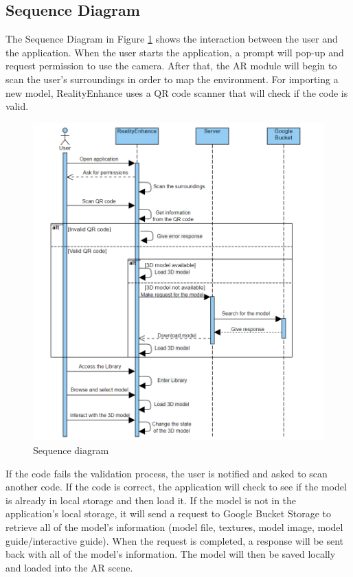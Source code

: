 \subsection*{Sequence Diagram}
The Sequence Diagram in Figure \ref{fig:SequenceDiagram} shows the interaction between the user and the application. When the user starts the application, a prompt will pop-up and request permission to use the camera. After that, the \ac{AR} module will begin to scan the user's surroundings in order to map the environment. For importing a new model, RealityEnhance uses a \ac{QR} code scanner that will check if the code is valid.
\begin{figure}[ht]
    \centering
    \includegraphics[width=1\textwidth]{img/SequenceDiagram.png}
    \caption{Sequence diagram}
    \label{fig:SequenceDiagram}
\end{figure}
\newpage

If the code fails the validation process, the user is notified and asked to scan another code. If the code is correct, the application will check to see if the model is already in local storage and then load it. If the model is not in the application's local storage, it will send a request to Google Bucket Storage to retrieve all of the model's information (model file, textures, model image, model guide/interactive guide). When the request is completed, a response will be sent back with all of the model's information. The model will then be saved locally and loaded into the AR scene.

